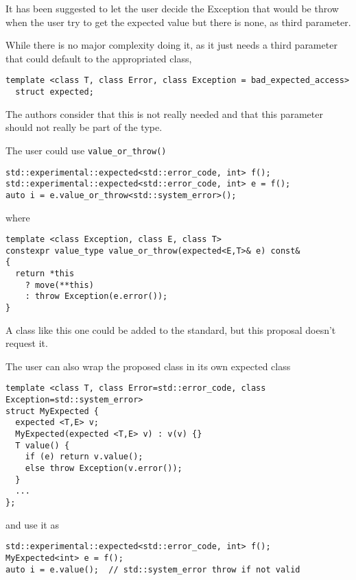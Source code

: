 \documentclass[a4paper,10pt]{article}
\newcommand{\cpp}[1]{\lstinline{#1}}
\begin{document}
It has been suggested to let the user decide the Exception that would be throw when the user try to get the expected value but there is none, as third parameter. 

While there is no major complexity doing it, as it just needs a third parameter that could default to the appropriated class, 

\begin{lstlisting}
template <class T, class Error, class Exception = bad_expected_access>
  struct expected;
\end{lstlisting}

\noindent
The authors consider that this is not really needed and that this parameter should not really be part of the type.

The user could use \cpp{value_or_throw()} 

\begin{lstlisting}
std::experimental::expected<std::error_code, int> f();
std::experimental::expected<std::error_code, int> e = f();
auto i = e.value_or_throw<std::system_error>();  
\end{lstlisting}

\noindent
where 

\begin{lstlisting}
template <class Exception, class E, class T>
constexpr value_type value_or_throw(expected<E,T>& e) const&
{
  return *this
    ? move(**this)
    : throw Exception(e.error());
}
\end{lstlisting}

\noindent
A class like this one could be added to the standard, but this proposal doesn't request it. 

The user can also wrap the proposed class in its own expected class

\begin{lstlisting}
template <class T, class Error=std::error_code, class Exception=std::system_error>
struct MyExpected {
  expected <T,E> v;
  MyExpected(expected <T,E> v) : v(v) {}
  T value() {  
    if (e) return v.value();
    else throw Exception(v.error());
  }
  ...
};
\end{lstlisting}

\noindent
and use it as

\begin{lstlisting}
std::experimental::expected<std::error_code, int> f();
MyExpected<int> e = f();
auto i = e.value();  // std::system_error throw if not valid
\end{lstlisting}
\end{document}
